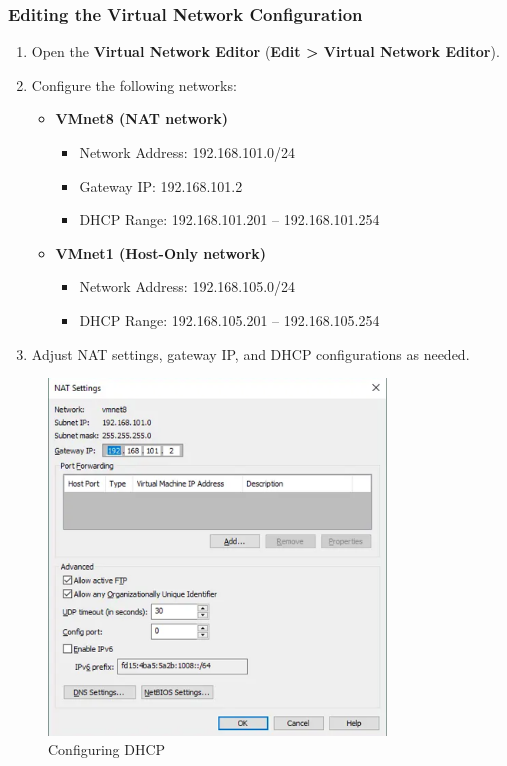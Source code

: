 \documentclass[a4paper,12pt]{article}
\begin{document}
\subsubsection{Editing the Virtual Network Configuration}
\begin{enumerate}
    \item Open the \textbf{Virtual Network Editor} (\textbf{Edit > Virtual Network Editor}).
    \item Configure the following networks:
    \begin{itemize}
        \item \textbf{VMnet8 (NAT network)}
        \begin{itemize}
            \item Network Address: 192.168.101.0/24
            \item Gateway IP: 192.168.101.2
            \item DHCP Range: 192.168.101.201 – 192.168.101.254
        \end{itemize}
        \item \textbf{VMnet1 (Host-Only network)}
        \begin{itemize}
            \item Network Address: 192.168.105.0/24
            \item DHCP Range: 192.168.105.201 – 192.168.105.254
        \end{itemize}
    \end{itemize}
    \item Adjust NAT settings, gateway IP, and DHCP configurations as needed.
\end{enumerate}
\begin{figure}[H]
    \centering
    \includegraphics[width=0.8\textwidth]{images/dhcp_config.png}  %
    \caption{Configuring DHCP}
\end{figure}
\end{document}
